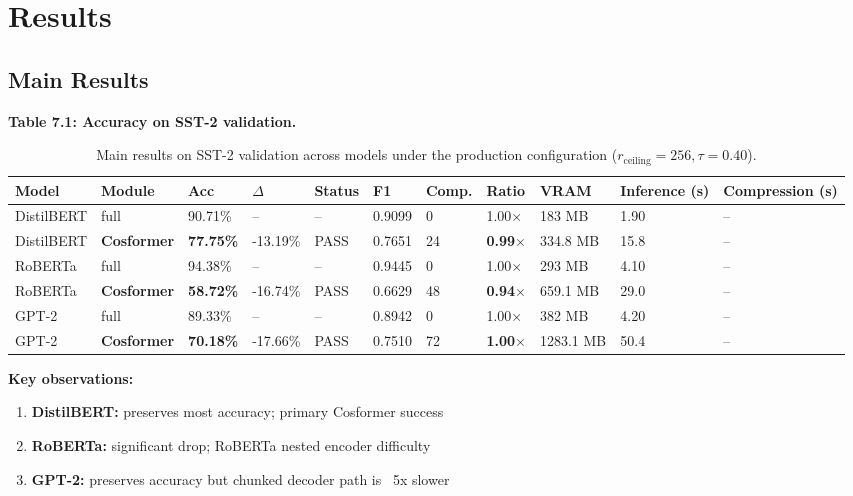 
\section{Results}

\subsection{Main Results}

\textbf{Table 7.1: Accuracy on SST-2 validation.}

\begin{table}[t]
\centering
\small
\begin{tabular}{lllllllllll}
\toprule
\textbf{Model} & \textbf{Module} & \textbf{Acc} & \textbf{$\Delta$} & \textbf{Status} & \textbf{F1} & \textbf{Comp.} & \textbf{Ratio} & \textbf{VRAM} & \textbf{Inference (s)} & \textbf{Compression (s)} \\
\midrule
DistilBERT & full & 90.71\% & -- & -- & 0.9099 & 0 & 1.00$\times$ & 183 MB & 1.90 & -- \\
DistilBERT & \textbf{Cosformer} & \textbf{77.75\%} & -13.19\% & PASS & 0.7651 & 24 & \textbf{0.99$\times$} & 334.8 MB & 15.8 & -- \\
RoBERTa & full & 94.38\% & -- & -- & 0.9445 & 0 & 1.00$\times$ & 293 MB & 4.10 & -- \\
RoBERTa & \textbf{Cosformer} & \textbf{58.72\%} & -16.74\% & PASS & 0.6629 & 48 & \textbf{0.94$\times$} & 659.1 MB & 29.0 & -- \\
GPT-2 & full & 89.33\% & -- & -- & 0.8942 & 0 & 1.00$\times$ & 382 MB & 4.20 & -- \\
GPT-2 & \textbf{Cosformer} & \textbf{70.18\%} & -17.66\% & PASS & 0.7510 & 72 & \textbf{1.00$\times$} & 1283.1 MB & 50.4 & -- \\
\bottomrule
\end{tabular}
\caption{Main results on SST-2 validation across models under the production configuration ($r_{\mathrm{ceiling}}=256, \tau=0.40$).}
\label{tab:main_sst2}
\end{table}

\textbf{Key observations:}

\begin{enumerate}
\item \textbf{DistilBERT:} preserves most accuracy; primary Cosformer success
\item \textbf{RoBERTa:} significant drop; RoBERTa nested encoder difficulty
\item \textbf{GPT-2:} preserves accuracy but chunked decoder path is ~5x slower

\end{enumerate}
